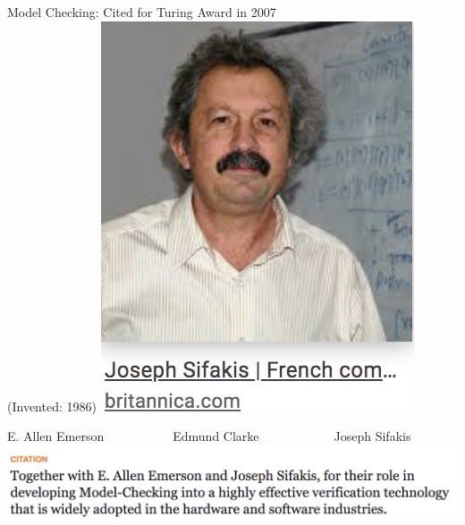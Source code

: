\documentclass{beamer}
\begin{document}
\begin{frame}{Model Checking: Cited for Turing Award in 2007 \\
(Invented: 1986)}
\includegraphics[scale=0.4]{pics/sifakis.png}

E. Allen Emerson~~~~~~~~~~~Edmund Clarke~~~~~~~~~~~~Joseph Sifakis
\includegraphics[scale=0.5]{pics/Citation.png} 
\end{frame}
\end{document}

